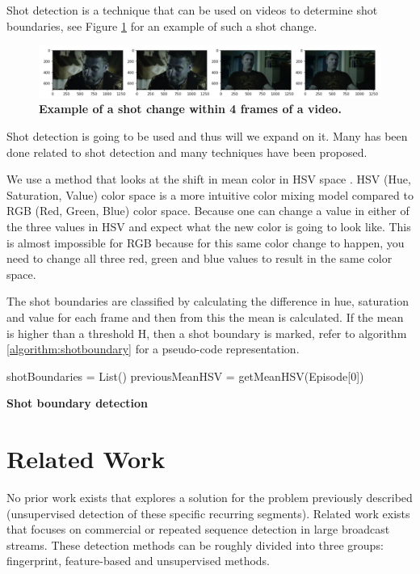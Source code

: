 \documentclass{article}
\begin{document}
Shot detection is a technique that can be used on videos to determine shot boundaries, see Figure \ref{shotchange} for an example of such a shot change. 

\begin{figure}[H]
	\includegraphics[width=12cm]{images/shotchange.jpg}
	\centering
	\caption{\textbf{Example of a shot change within 4 frames of a video.}}
	\label{shotchange}
\end{figure}

Shot detection is going to be used and thus will we expand on it. Many has been done related to shot detection \cite{lienhart1998comparison} and many techniques have been proposed. 

We use a method that looks at the shift in mean color in HSV space \cite{shao2015shot}. HSV (Hue, Saturation, Value) color space is a more intuitive color mixing model compared to RGB (Red, Green, Blue) color space. Because one can change a value in either of the three values in HSV and expect what the new color is going to look like. This is almost impossible for RGB because for this same color change to happen, you need to change all three red, green and blue values to result in the same color space.

The shot boundaries are classified by calculating the difference in hue, saturation and value for each frame and then from this the mean is calculated. If the mean is higher than a threshold H, then a shot boundary is marked, refer to algorithm \ref{algorithm:shotboundary} for a pseudo-code representation.

\begin{algorithm}[H] 
	\SetAlgoLined
	shotBoundaries = List()\;
	previousMeanHSV = getMeanHSV(Episode[0])\;
	\caption{\textbf{Shot boundary detection}}
	\label{algorithm:shotboundary}
\end{algorithm}

\section{Related Work} \label{relatedwork}

No prior work exists that explores a solution for the problem previously described (unsupervised detection of these specific recurring segments). Related work exists that focuses on commercial or repeated sequence detection in large broadcast streams. These detection methods can be roughly divided into three groups: fingerprint, feature-based and unsupervised methods. 
\end{document}
